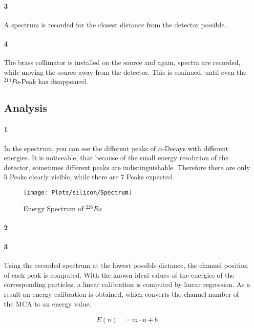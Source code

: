 \documentclass[12pt,twoside,a4paper]{scrartcl}
\begin{document}
		\paragraph{3}
			A spectrum is recorded for the closest distance from the detector possible.

		\paragraph{4}
			The brass collimator is installed on the source and again, spectra are recorded, while moving the source away from the detector. This is coninued, until even the $^{214}Po$-Peak has disappeared.

	\subsection{Analysis}

		\paragraph{1}

			In the spectrum, you can see the different peaks of $\alpha$-Decays with different energies. It is noticeable, that because of the small energy resolution of the detector, sometimes different peaks are indistinguishable. Therefore there are only 5 Peaks clearly visible, while there are 7 Peaks expected.

			\begin{figure}
				\texttt{[image: Plots/silicon/Spectrum]}
				\caption{Energy Spectrum of $ ^{226}Ra$}
				\label{SI::Spectrum}
			\end{figure}

		\paragraph{2}

		\paragraph{3}
			Using the recorded spectrum at the lowest possible distance, the channel position of each peak is computed. With the known ideal values of the energies of the corresponding particles, a linear calibration is computed by linear regression. As a result an energy calibration is obtained, which converts the channel number of the MCA to an energy value.

			\begin{align}
					E(n) &= m \cdot n + b
			\end{align}
\end{document}
